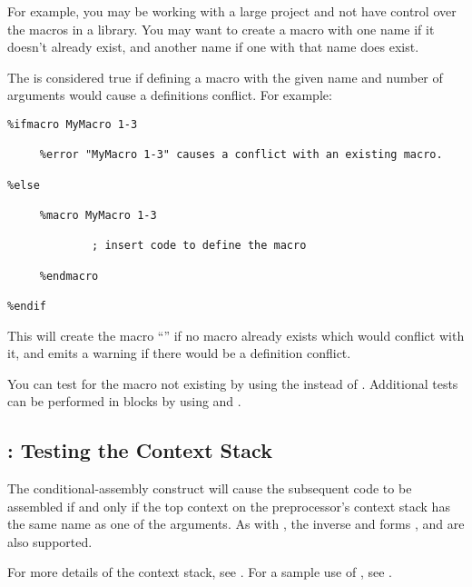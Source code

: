 For example, you may be working with a large project and not have control
over the macros in a library. You may want to create a macro with one
name if it doesn't already exist, and another name if one with that name
does exist.

The  is considered true if defining a macro with the given name
and number of arguments would cause a definitions conflict. For example:

\begin{lstlisting}
%ifmacro MyMacro 1-3

     %error "MyMacro 1-3" causes a conflict with an existing macro.

%else

     %macro MyMacro 1-3

             ; insert code to define the macro

     %endmacro

%endif
\end{lstlisting}

This will create the macro ``'' if no macro already exists which
would conflict with it, and emits a warning if there would be a definition
conflict.

You can test for the macro not existing by using the 
instead of . Additional tests can be performed in
 blocks by using  and
.

\subsection{: Testing the Context Stack
}
\label{subsec:ifctx}

The conditional-assembly construct  will cause the
subsequent code to be assembled if and only if the top context on
the preprocessor's context stack has the same name as one of the arguments.
As with , the inverse and  forms ,
 and  are also supported.

For more details of the context stack, see .
For a sample use of , see .

